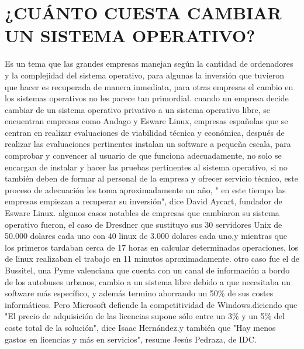 \section*{¿CUÁNTO  CUESTA  CAMBIAR  UN SISTEMA  OPERATIVO?}
Es  un tema  que  las  grandes empresas  manejan  según  la cantidad de ordenadores  y la complejidad del sistema  operativo, para  algunas   la  inversión que  tuvieron que  
hacer  es recuperada  de manera   inmediata, para  otras  empresas  el  cambio  en  los sistemas  operativos no les parece  tan  primordial.
cuando un  empresa  decide   cambiar  de un  sistema  operativo  privativo  a  un sistema  operativo libre, se  encuentran  empresas  como  Andago y Esware Linux, empresas  
españolas  que  se  centran  en  realizar evaluaciones de viabilidad técnica  y económica, después  de realizar  las  evaluaciones  pertinentes   instalan  un  software  a  
pequeña  escala, para  comprobar y  convencer  al usuario de que  funciona adecuadamente, no solo se encargan de instalar y  hacer  las  pruebas pertinentes al sistema operativo, 
si no   también  deben  de   formar  al personal  de la  empresa  y ofrecer  servicio  técnico, este  proceso  de adecuación les  toma aproximadamente   un  año,  " en este  
tiempo  las  empresas  empiezan a  recuperar  su  inversión",  dice  David Aycart, fundador  de Esware Linux.
algunos casos  notables  de empresas  que  cambiaron su sistema  operativo fueron,  el caso de Dresdner  que sustituyo sus  30 servidores Unix de 50.000 dolares cada  uno con  40 
linux de 3.000 dolares cada uno,y mientras  que  los primeros  tardaban  cerca de  17 horas en calcular determinadas operaciones, los de  linux  realizaban el trabajo en 11 
minutos aproximadamente.
otro caso  fue  el de Bussitel, una Pyme valenciana que  cuenta  con un canal de  información a bordo de los autobuses urbanos, cambio a un sistema libre debido a que necesitaba 
un software más específico, y además  termino  ahorrando  un 50\% de sus  costes informáticos.
Pero  Microsoft defiende la competitividad de Windows.diciendo que  "El precio de adquisición de las licencias supone sólo entre un 3\% y un 5\% del coste total de la solución", 
dice Isaac Hernández.y  también que  "Hay menos gastos en licencias y más en servicios", resume  Jesús Pedraza, de IDC.






 